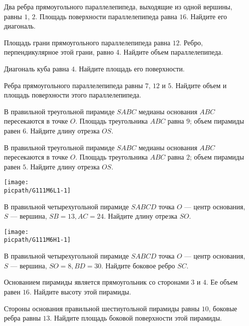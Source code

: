 \begin{homework}[number=1]
	\begin{listofex}
		\item Два ребра прямоугольного параллелепипеда, выходящие из одной вершины, равны \( 1 \), \( 2 \). Площадь поверхности параллелепипеда равна \( 16 \). Найдите его диагональ.
		\item Площадь грани прямоугольного параллелепипеда равна \( 12 \). Ребро, перпендикулярное этой грани, равно 4. Найдите объем параллелепипеда.
		\item Диагональ куба равна \( 4 \). Найдите площадь его поверхности.
		\item Ребра прямоугольного параллелепипеда равны \( 7 \), \( 12 \) и \( 5 \). Найдите объем и площадь поверхности этого параллелепипеда.
		\item В правильной треугольной пирамиде \(SABC\) медианы основания \(ABC\) пересекаются в точке \(O\). Площадь треугольника \(ABC\) равна \(9\); объем пирамиды равен \(6\). Найдите длину отрезка \(OS\).
		\item 
		\begin{minipage}[t]{\bodywidth}
			В правильной треугольной пирамиде \(SABC\) медианы основания \(ABC\) пересекаются в точке \(O\). Площадь треугольника \(ABC\) равна \(2\); объем пирамиды равен \(5\). Найдите длину отрезка \(OS\).
		\end{minipage}
		\hspace{0.02\linewidth}
		\begin{minipage}[t]{\picwidth}
		\texttt{[image: \\picpath/G111M6L1-1]}
		\end{minipage}
		\item 
		\begin{minipage}[t]{\bodywidth}
			В правильной четырехугольной пирамиде \(SABCD\) точка \(O\) --- центр основания, \(S\) --- вершина, \(SB=13, AC=24\). Найдите длину отрезка \(SO\).
		\end{minipage}
		\hspace{0.02\linewidth}
		\begin{minipage}[t]{\picwidth}
			\texttt{[image: \\picpath/G111M6H1-1]}
		\end{minipage}
		\item В правильной четырехугольной пирамиде \(SABCD\) точка \(O\) --- центр основания, \(S\) --- вершина, \(SO=8, BD=30\). Найдите боковое ребро \(SC\).
		\item Основанием пирамиды является прямоугольник со сторонами \(3\) и \(4\). Ее объем равен \(16\). Найдите высоту этой пирамиды.
		\item Стороны основания правильной шестиугольной пирамиды равны \(10\), боковые ребра равны \(13\). Найдите площадь боковой поверхности этой пирамиды.
	\end{listofex}
\end{homework}

